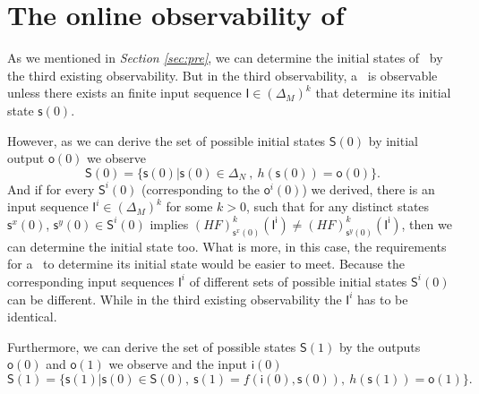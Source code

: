 

\section{The online observability of \BCNs}
\label{sec:online}

%



As we mentioned in {\em Section \ref{sec:pre}}, we can determine the initial states of \BCNs\ by the third existing observability. But in the third observability, a \BCN\ is observable unless there exists an finite input sequence $\mathsf{I}\in(\Delta_M)^k$ that determine its initial state $\mathsf{s}(0)$. 

However, as we can derive the set of possible initial states $\mathsf{S}(0)$ by initial output $\mathsf{o}(0)$ we observe
\[\mathsf{S}(0)=\{\mathsf{s}(0)|\mathsf{s}(0)\in \Delta_N\ ,\ h( \mathsf{s}(0))=\mathsf{o}(0)\}.\]
And if for every $\mathsf{S}^{i}(0)$ (corresponding to the $\mathsf{o}^{i}(0)$) we derived, there is an input sequence $\mathsf{I}^{i}\in(\Delta_M)^k$ for some $k>0$, such that for any distinct states $\mathsf{s}^{x}(0)$, $\mathsf{s}^{y}(0) \in \mathsf{S}^{i}(0)$ implies $(HF)^k_{\mathsf{s}^{x}(0)}(\mathsf{I^i})\neq (HF)^k_{\mathsf{s}^{y}(0)}(\mathsf{I^i})$,
then we can determine the initial state too. 
What is more, in this case, the requirements for a \BCN\ to determine its initial state would be easier to meet. Because the corresponding input sequences $\mathsf{I}^{i}$ of different sets of possible initial states $\mathsf{S}^{i}(0)$ can be different. While in the third existing observability the $\mathsf{I}^{i}$ has to be identical.

Furthermore, we can derive the set of possible states $\mathsf{S}(1)$ by the outputs $\mathsf{o}(0)$ and $\mathsf{o}(1)$ we observe and the input $\mathsf{i}(0)$ 
\[\mathsf{S}(1)=\{\mathsf{s}(1)|\mathsf{s}(0)\in \mathsf{S}(0),\ \mathsf{s}(1)=f({\mathsf{i}(0)},{\mathsf{s}(0)}),\ h(\mathsf{s}(1))=\mathsf{o}(1)\}.\]

